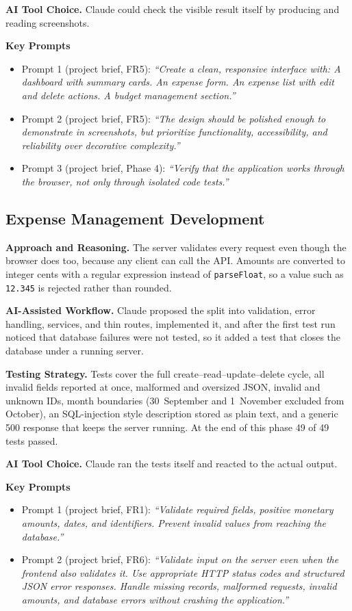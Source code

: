 \documentclass[11pt,a4paper]{article}
\newcommand{\prompt}[1]{\textit{``#1''}}
\begin{document}
\textbf{AI Tool Choice.} Claude could check the visible result itself by
producing and reading screenshots.

\textbf{Key Prompts}
\begin{itemize}
    \item Prompt 1 (project brief, FR5): \prompt{Create a clean, responsive interface with: A dashboard with summary cards. An expense form. An expense list with edit and delete actions. A budget management section.}
    \item Prompt 2 (project brief, FR5): \prompt{The design should be polished enough to demonstrate in screenshots, but prioritize functionality, accessibility, and reliability over decorative complexity.}
    \item Prompt 3 (project brief, Phase 4): \prompt{Verify that the application works through the browser, not only through isolated code tests.}
\end{itemize}

\subsection{Expense Management Development}

\textbf{Approach and Reasoning.} The server validates every request even
though the browser does too, because any client can call the API.
Amounts are converted to integer cents with a regular expression instead
of \texttt{parseFloat}, so a value such as \texttt{12.345} is rejected
rather than rounded.

\textbf{AI-Assisted Workflow.} Claude proposed the split into
validation, error handling, services, and thin routes, implemented it,
and after the first test run noticed that database failures were not
tested, so it added a test that closes the database under a running
server.

\textbf{Testing Strategy.} Tests cover the full create--read--update--delete
cycle, all invalid fields reported at once, malformed and oversized JSON,
invalid and unknown IDs, month boundaries (30~September and 1~November
excluded from October), an SQL-injection style description stored as
plain text, and a generic 500 response that keeps the server running.
At the end of this phase 49 of 49 tests passed.

\textbf{AI Tool Choice.} Claude ran the tests itself and reacted to the
actual output.

\textbf{Key Prompts}
\begin{itemize}
    \item Prompt 1 (project brief, FR1): \prompt{Validate required fields, positive monetary amounts, dates, and identifiers. Prevent invalid values from reaching the database.}
    \item Prompt 2 (project brief, FR6): \prompt{Validate input on the server even when the frontend also validates it. Use appropriate HTTP status codes and structured JSON error responses. Handle missing records, malformed requests, invalid amounts, and database errors without crashing the application.}
\end{itemize}
\end{document}
